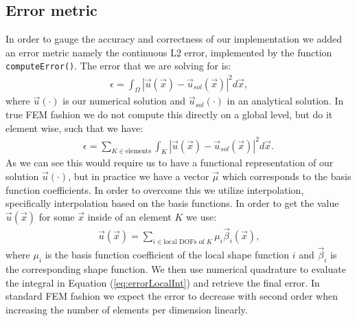 \subsection{Error metric}
\label{subsubsec:error_metric}
In order to gauge the accuracy and correctness of our implementation we added an error metric namely the continuous L2 error, implemented by the function \texttt{computeError()}. The error that we are solving for is:
\begin{align}
    \epsilon = \int_\Omega |\vec{u}(\vec{x}) - \vec{u}_{sol}(\vec{x})|^2 d\vec{x}\text{,}
\end{align}
where $\vec{u}(\cdot)$ is our numerical solution and $\vec{u}_{sol}(\cdot)$ in an analytical solution. In true FEM fashion we do not compute this directly on a global level, but do it element wise, such that we have:
\begin{align}
    \epsilon = \sum_{K\in \text{elements}} \int_K |\vec{u}(\vec{x}) - \vec{u}_{sol}(\vec{x})|^2 d\vec{x}\text{.} \label{eq:errorLocalInt}
\end{align}
As we can see this would require us to have a functional representation of our solution $\vec{u}(\cdot)$, but in practice we have a vector $\vec{\mu}$ which corresponds to the basis function coefficients. In order to overcome this we utilize interpolation, specifically interpolation based on the basis functions. In order to get the value \(\vec{u}(\vec{x})\) for some \(\vec{x}\) inside of an element \(K\) we use:
\begin{align}
    \vec{u}(\vec{x}) = \sum_{i \in \text{local DOFs of }K} \mu_i \vec{\beta}_i(\vec{x})\text{,} \label{eq:interpolation}
\end{align}
where \(\mu_i\) is the basis function coefficient of the local shape function \(i\) and \(\vec{\beta}_i\) is the corresponding shape function. We then use numerical quadrature to evaluate the integral in Equation (\ref{eq:errorLocalInt}) and retrieve the final error. In standard FEM fashion we expect the error to decrease with second order when increasing the number of elements per dimension linearly.




